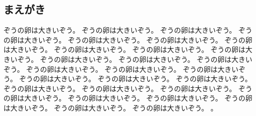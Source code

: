 \documentclass[../master_plan2]{subfiles}
\begin{document}
\subsection{まえがき}
ぞうの卵は大きいぞう。\cite{Buckel1995}
ぞうの卵は大きいぞう。
ぞうの卵は大きいぞう。
ぞうの卵は大きいぞう。
ぞうの卵は大きいぞう。
ぞうの卵は大きいぞう。
ぞうの卵は大きいぞう。
ぞうの卵は大きいぞう。
ぞうの卵は大きいぞう。
ぞうの卵は大きいぞう。
ぞうの卵は大きいぞう。
ぞうの卵は大きいぞう。
ぞうの卵は大きいぞう。
ぞうの卵は大きいぞう。
ぞうの卵は大きいぞう。
ぞうの卵は大きいぞう。
ぞうの卵は大きいぞう。
ぞうの卵は大きいぞう。
ぞうの卵は大きいぞう。
ぞうの卵は大きいぞう。
ぞうの卵は大きいぞう。
ぞうの卵は大きいぞう。
ぞうの卵は大きいぞう。
ぞうの卵は大きいぞう。
ぞうの卵は大きいぞう。
ぞうの卵は大きいぞう。
ぞうの卵は大きいぞう。
ぞうの卵は大きいぞう。
\cite{Series}。
\end{document}
